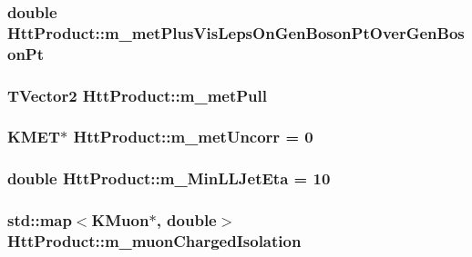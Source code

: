 \label{classHttProduct_a7c4828e5053357081c0b6013762913cd}
\hypertarget{classHttProduct_aff2a9293122d9236decdc9ee37d16916}{
\subsubsection[{m\_\-metPlusVisLepsOnGenBosonPtOverGenBosonPt}]{\setlength{\rightskip}{0pt plus 5cm}double {\bf HttProduct::m\_\-metPlusVisLepsOnGenBosonPtOverGenBosonPt}}}
\label{classHttProduct_aff2a9293122d9236decdc9ee37d16916}
\hypertarget{classHttProduct_a9cad0f70398e40cc1b27bbbb5ca3f25b}{
\subsubsection[{m\_\-metPull}]{\setlength{\rightskip}{0pt plus 5cm}TVector2 {\bf HttProduct::m\_\-metPull}}}
\label{classHttProduct_a9cad0f70398e40cc1b27bbbb5ca3f25b}
\hypertarget{classHttProduct_a262e1f83347405eaad1b7f4324f1ca43}{
\subsubsection[{m\_\-metUncorr}]{\setlength{\rightskip}{0pt plus 5cm}KMET$\ast$ {\bf HttProduct::m\_\-metUncorr} = 0}}
\label{classHttProduct_a262e1f83347405eaad1b7f4324f1ca43}
\hypertarget{classHttProduct_a306c181da30a859bd7a13a8beadbdde8}{
\subsubsection[{m\_\-MinLLJetEta}]{\setlength{\rightskip}{0pt plus 5cm}double {\bf HttProduct::m\_\-MinLLJetEta} = 10}}
\label{classHttProduct_a306c181da30a859bd7a13a8beadbdde8}
\hypertarget{classHttProduct_a39b3d69fe737078f76c46dae49670add}{
\subsubsection[{m\_\-muonChargedIsolation}]{\setlength{\rightskip}{0pt plus 5cm}std::map$<$KMuon$\ast$, double$>$ {\bf HttProduct::m\_\-muonChargedIsolation}}}

